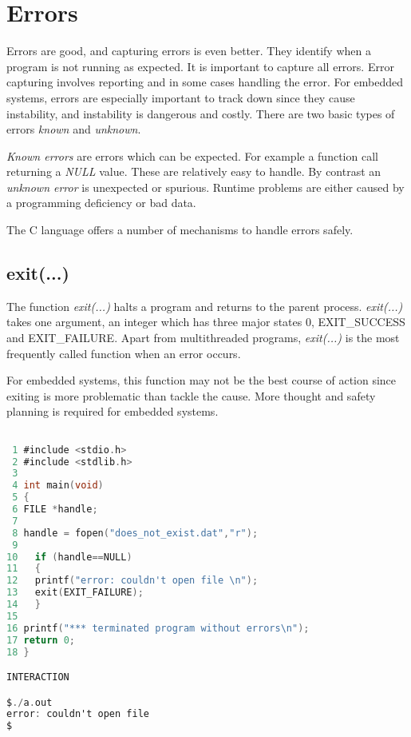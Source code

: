 \section{Errors} \label{errors}

Errors are good, and capturing errors is even better. They identify when a program is not running as expected. It is important to capture all errors. Error capturing involves reporting and in some cases handling the error. For embedded systems, errors are especially important to track down since they cause instability, and instability is dangerous and costly. There are two basic types of errors \textit{known} and \textit{unknown}.

\textit{Known errors} are errors which can be expected. For example a function call returning a \textit{NULL} value. These are relatively easy to handle. By contrast an \textit{unknown error} is unexpected or spurious. Runtime problems are either caused by a programming deficiency or bad data. 

The C language offers a number of mechanisms to handle errors safely.

\subsection{exit(...)}


The function \textit{exit(...)} halts a program and returns to the parent process. \textit{exit(...)} takes one argument, an integer which has three major states 0, EXIT\_SUCCESS and EXIT\_FAILURE. Apart from  multithreaded programs, \textit{exit(...)} is the most frequently called function when an error occurs. 

For embedded systems, this function may not be the best course of action since exiting is more problematic than tackle the cause. More thought and safety planning is required for embedded systems.

\begin{lstlisting}[language=C,showstringspaces=false,caption={File exit.c, using exit(...) to terminate program},captionpos=b,label=exit]

 1 #include <stdio.h> 
 2 #include <stdlib.h>
 3
 4 int main(void)
 5 {
 6 FILE *handle;
 7  
 8 handle = fopen("does_not_exist.dat","r");
 9
10   if (handle==NULL)
11   {
12   printf("error: couldn't open file \n");
13   exit(EXIT_FAILURE);
14   }
15
16 printf("*** terminated program without errors\n");
17 return 0;
18 }

INTERACTION

$./a.out
error: couldn't open file
$

\end{lstlisting}

